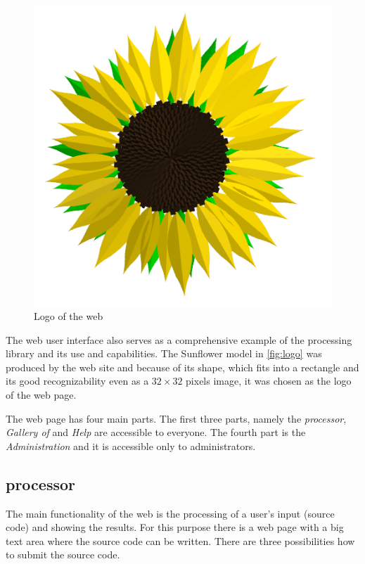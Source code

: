 \begin{figure}
	\vspace{-20pt}
	\includegraphics[width=\linewidth]{Sunflower}
	\caption{Logo of the web}
	\label{fig:logo}
	\vspace{-20pt}
\end{figure}

The web user interface also serves as a comprehensive example of the \lsystem processing library and its use and capabilities.
The Sunflower model in \autoref{fig:logo} was produced by the web site and because of its shape, which fits into a rectangle and its good recognizability even as a $32 \times 32$ pixels image, it was chosen as the logo of the web page.

The web page has four main parts.
The first three parts, namely the \emph{\lsystem processor}, \emph{Gallery of \lsystems} and \emph{Help} are accessible to everyone.
The fourth part is the \emph{Administration} and it is accessible only to administrators.


\subsection{\lsystem processor}

The main functionality of the web is the processing of a user's input (source code) and showing the results.
For this purpose there is a web page with a big text area where the source code can be written.
There are three possibilities how to submit the source code.

